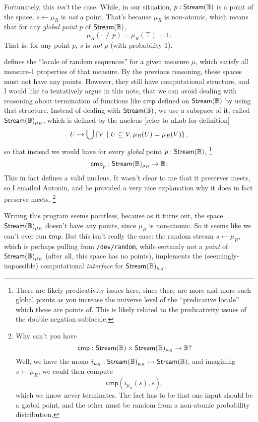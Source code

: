 Fortunately, this \emph{isn't} the case. While, in our situation, $p : \mathsf{Stream}(\mathbb{B})$ is a point of the space, $s \leftarrow \mu_R$ is \emph{not} a point. That's because $\mu_R$ is non-atomic, which means that for any \emph{global point} $p$ of $\mathsf{Stream}(\mathbb{B})$,
\[
\mu_R(\cdot \neq p) = \mu_R(\top) = 1.
\]
That is, for any point $p$, $s$ is \emph{not} $p$ (with probability 1).

\cite{simpson2012} defines the ``locale of random sequences'' for a given measure $\mu$, which satisfy all measure-1 properties of that measure. By the previous reasoning, these spaces must not have any points. However, they still have computational structure, and I would like to tentatively argue in this note, that we can avoid dealing with reasoning about termination of functions like $\mathsf{cmp}$ defined on $\mathsf{Stream}(\mathbb{B})$ by using that structure. Instead of dealing with $\mathsf{Stream}(\mathbb{B})$, we use a subspace of it, called $\mathsf{Stream}(\mathbb{B})_{\mu_R}$, which is defined by the nucleus [refer to nLab for definition]
\[
U \mapsto \bigcup \left\{ V \ |\  U \subseteq V, \mu_R(U) = \mu_R(V) \right\},
\]
so that instead we would have for every \emph{global} point $p : \mathsf{Stream}(\mathbb{B})$,
\footnote{There are likely predicativity issues here, since there are more and more such global points as you increase the universe level of the ``predicative locale'' which these are points of. This is likely related to the predicativity issues of the double negation sublocale.}
\[
\mathsf{cmp}_p : \mathsf{Stream}(\mathbb{B})_{\mu_R} \to \mathbb{B}.
\]
This in fact defines a valid nucleus. It wasn't clear to me that it preserves meets, so I emailed Antonin, and he provided a very nice explanation why it does in fact preserve meets.
\footnote{Why can't you have 
\[
\mathsf{cmp} :  \mathsf{Stream}(\mathbb{B}) \times \mathsf{Stream}(\mathbb{B})_{\mu_R} \to \mathbb{B}?
\]
Well, we have the mono $i_{\mu_R} : \mathsf{Stream}(\mathbb{B})_{\mu_R} \rightarrowtail \mathsf{Stream}(\mathbb{B})$, and imagining $s \leftarrow \mu_R$, we could then compute
\[
\mathsf{cmp}(i_{\mu_R}(s), s),
\]
which we know never terminates. The fact has to be that one input should be a global point, and the other must be random from a non-atomic probability distribution.}

Writing this program seems pointless, because as it turns out, the space $\mathsf{Stream}(\mathbb{B})_{\mu_R}$ doesn't have any points, since $\mu_R$ is non-atomic. So it seems like we can't ever run $\mathsf{cmp}$. But this isn't really the case: the random stream $s \leftarrow \mu_R$, which is perhaps pulling from \texttt{/dev/random}, while certainly not a \emph{point} of $\mathsf{Stream}(\mathbb{B})_{\mu_R}$ (after all, this space has no points), implements the (seemingly-impossible) computational \emph{interface} for $\mathsf{Stream}(\mathbb{B})_{\mu_R}$.


